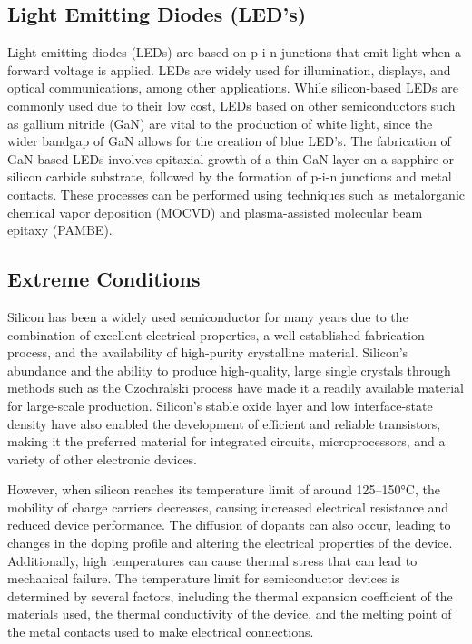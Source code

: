 \subsection{Light Emitting Diodes (LED's)}
Light emitting diodes (LEDs) are based on p-i-n junctions that emit light when a forward voltage is applied. LEDs are widely used for illumination, displays, and optical communications, among other applications. While silicon-based LEDs are commonly used due to their low cost, LEDs based on other semiconductors such as gallium nitride (GaN) are vital to the production of white light, since the wider bandgap of GaN allows for the creation of blue LED's. The fabrication of GaN-based LEDs involves epitaxial growth of a thin GaN layer on a sapphire or silicon carbide substrate, followed by the formation of p-i-n junctions and metal contacts. These processes can be performed using techniques such as metalorganic chemical vapor deposition (MOCVD) and plasma-assisted molecular beam epitaxy (PAMBE).

\subsection{Extreme Conditions}
Silicon has been a widely used semiconductor for many years due to the combination of excellent electrical properties, a well-established fabrication process, and the availability of high-purity crystalline material. Silicon's abundance and the ability to produce high-quality, large single crystals through methods such as the Czochralski process have made it a readily available material for large-scale production. Silicon's stable oxide layer and low interface-state density have also enabled the development of efficient and reliable transistors, making it the preferred material for integrated circuits, microprocessors, and a variety of other electronic devices.

However, when silicon reaches its temperature limit of around 125--150\si{\degreeCelsius}, the mobility of charge carriers decreases, causing increased electrical resistance and reduced device performance. The diffusion of dopants can also occur, leading to changes in the doping profile and altering the electrical properties of the device. Additionally, high temperatures can cause thermal stress that can lead to mechanical failure. The temperature limit for semiconductor devices is determined by several factors, including the thermal expansion coefficient of the materials used, the thermal conductivity of the device, and the melting point of the metal contacts used to make electrical connections. 

